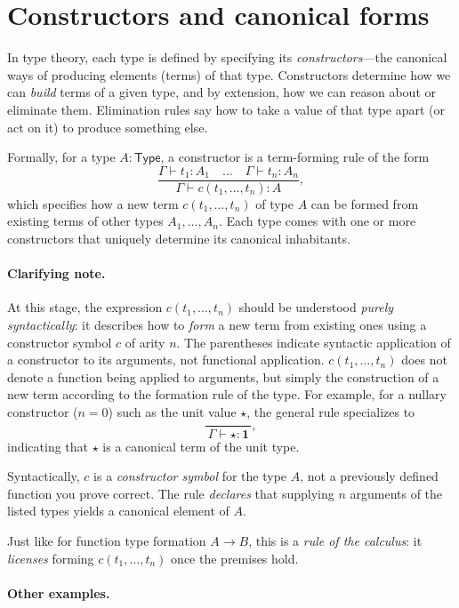 \documentclass{article}
\newcommand{\Type}{\ensuremath{\mathsf{Type}}}
\begin{document}
\section{Constructors and canonical forms}

In type theory, each type is defined by specifying its \emph{constructors}—the canonical ways of producing elements (terms) of that type.  
Constructors determine how we can \emph{build} terms of a given type, and by extension, how we can reason about or eliminate them. Elimination rules say how to take a value of that type apart (or act on it) to produce something else.

Formally, for a type \(A : \Type\), a constructor is a term-forming rule of the form
\[
\frac{\Gamma \vdash t_1 : A_1 \quad \dots \quad \Gamma \vdash t_n : A_n}{\Gamma \vdash c(t_1,\dots,t_n) : A},
\]
which specifies how a new term \(c(t_1,\dots,t_n)\) of type \(A\) can be formed from existing terms of other types \(A_1,\dots,A_n\).  
Each type comes with one or more constructors that uniquely determine its canonical inhabitants.

\paragraph{Clarifying note.}
At this stage, the expression \(c(t_1,\dots,t_n)\) should be understood
\emph{purely syntactically}: it describes how to \emph{form} a new term from
existing ones using a constructor symbol \(c\) of arity \(n\).
The parentheses indicate syntactic application of a constructor to its arguments, not functional application. \(c(t_1,\dots,t_n)\) does not denote a function being applied to arguments, but simply the construction of a new term according to the formation rule of the type. For example, for a nullary constructor (\(n=0\)) such as the unit value \(\star\),
the general rule specializes to
\[
\frac{}{\,\Gamma \vdash \star : \mathbf{1}\,},
\]
indicating that \(\star\) is a canonical term of the unit type.

Syntactically, \(c\) is a \emph{constructor symbol} for the type \(A\), not a previously defined function you prove correct. The rule \emph{declares} that supplying \(n\) arguments of the listed types yields a canonical element of \(A\).

Just like for function type formation \(A \to B\), this is a \emph{rule of the calculus}: it \emph{licenses} forming \(c(t_1,\dots,t_n)\) once the premises hold. 

\paragraph{Other examples.}
\end{document}

